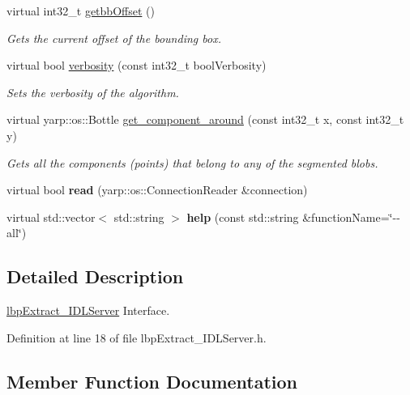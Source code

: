 \begin{DoxyCompactItemize}
virtual int32\+\_\+t \mbox{\hyperlink{classlbpExtract__IDLServer_a2260626a2137fc9ffe9364fad3444024}{getbb\+Offset}} ()
\begin{DoxyCompactList}\small\item\em Gets the current offset of the bounding box. \end{DoxyCompactList}\item 
virtual bool \mbox{\hyperlink{classlbpExtract__IDLServer_a1b9021d363199f1a334c7ec2c23801b1}{verbosity}} (const int32\+\_\+t bool\+Verbosity)
\begin{DoxyCompactList}\small\item\em Sets the verbosity of the algorithm. \end{DoxyCompactList}\item 
virtual yarp\+::os\+::\+Bottle \mbox{\hyperlink{classlbpExtract__IDLServer_a9d92e9eba6c2ea72a43b1c8077bc6d0a}{get\+\_\+component\+\_\+around}} (const int32\+\_\+t x, const int32\+\_\+t y)
\begin{DoxyCompactList}\small\item\em Gets all the components (points) that belong to any of the segmented blobs. \end{DoxyCompactList}\item 
\mbox{\label{classlbpExtract__IDLServer_a677697653e78ed82aaa6543eb875bd41}} 
virtual bool {\bfseries read} (yarp\+::os\+::\+Connection\+Reader \&connection)
\item 
\mbox{\label{classlbpExtract__IDLServer_a13b6fbd034b38f4b5879381dabad05ed}} 
virtual std\+::vector$<$ std\+::string $>$ {\bfseries help} (const std\+::string \&function\+Name=\char`\"{}-\/-\/all\char`\"{})
\end{DoxyCompactItemize}


\subsection{Detailed Description}
\mbox{\hyperlink{classlbpExtract__IDLServer}{lbp\+Extract\+\_\+\+I\+D\+L\+Server}} Interface. 

Definition at line 18 of file lbp\+Extract\+\_\+\+I\+D\+L\+Server.\+h.



\subsection{Member Function Documentation}
\mbox{\label{classlbpExtract__IDLServer_a9d92e9eba6c2ea72a43b1c8077bc6d0a}} 
